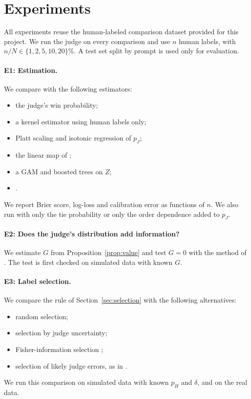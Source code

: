 \section{Experiments}
\label{sec:experiments}

All experiments reuse the human-labeled comparison dataset provided for this project. We run the
judge on every comparison and use $n$ human labels, with $n/N\in\{1,2,5,10,20\}\%$. A test set split
by prompt is used only for evaluation.

\paragraph{E1: Estimation.}
We compare \dfsp{} with the following estimators:
\begin{itemize}
  \item the judge's win probability;
  \item a kernel estimator using human labels only;
  \item Platt scaling and isotonic regression of $p_J$;
  \item the linear map of \citet{vandenburg2025aligning};
  \item a GAM and boosted trees on $Z$;
  \item \sfsp.
\end{itemize}
We report Brier score, log-loss and calibration error as functions of $n$. We also run \dfsp{} with
only the tie probability or only the order dependence added to $p_J$.

\paragraph{E2: Does the judge's distribution add information?}
We estimate $G$ from Proposition~\ref{prop:value} and test $G=0$ with the method of
\citet{williamson2023general}. The test is first checked on simulated data with known $G$.

\paragraph{E3: Label selection.}
We compare the rule of Section~\ref{sec:selection} with the following alternatives:
\begin{itemize}
  \item random selection;
  \item selection by judge uncertainty;
  \item Fisher-information selection \citep{shen2025active};
  \item selection of likely judge errors, as in \citet{xu2025rlthf}.
\end{itemize}
We run this comparison on simulated data with known $p_H$ and $\delta$, and on the real data.

